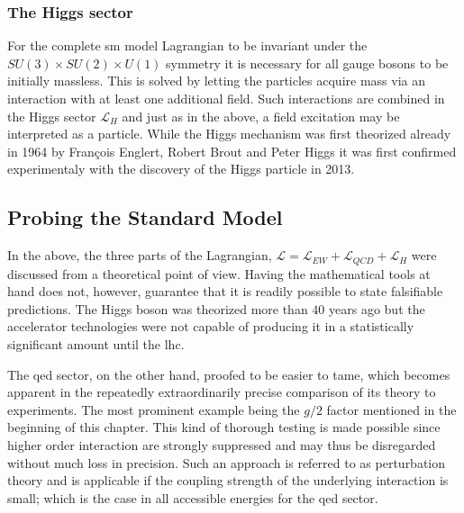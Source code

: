 \subsubsection{The Higgs sector}
\label{sec:higgs}

For the complete \gls{sm} model Lagrangian to be invariant under the $SU(3)\times SU(2) \times U(1)$ symmetry it is necessary for all gauge bosons to be initially massless. This is solved by letting the particles acquire mass via an interaction with at least one additional field. Such interactions are combined in the Higgs sector $\mathcal{L}_H$ and just as in the above, a field excitation may be interpreted as a particle. While the Higgs mechanism was first theorized already in 1964 by François Englert, Robert Brout \cite{Englert1964} and Peter Higgs \cite{Higgs1964} it was first confirmed experimentaly with the discovery of the Higgs particle in 2013.


\subsection{Probing the Standard Model}
\label{sec:prob-sm}

In the above, the three parts of the Lagrangian, $\mathcal{L} = \mathcal{L}_{EW} + \mathcal{L}_{QCD} + \mathcal{L}_{H}$ were discussed from a theoretical point of view. Having the mathematical tools at hand does not, however, guarantee that it is readily possible to state falsifiable predictions. The Higgs boson was theorized more than $40$ years ago but the accelerator technologies were not capable of producing it in a statistically significant amount until the \gls{lhc}. 

The \gls{qed} sector, on the other hand, proofed to be easier to tame, which becomes apparent in the repeatedly extraordinarily precise comparison of its theory to experiments. The most prominent example being the $g/2$ factor mentioned in the beginning of this chapter. This kind of thorough testing is made possible since higher order interaction are strongly suppressed and may thus be disregarded without much loss in precision. Such an approach is referred to as perturbation theory and is applicable if the coupling strength of the underlying interaction is small; which is the case in all accessible energies for the \gls{qed} sector.

